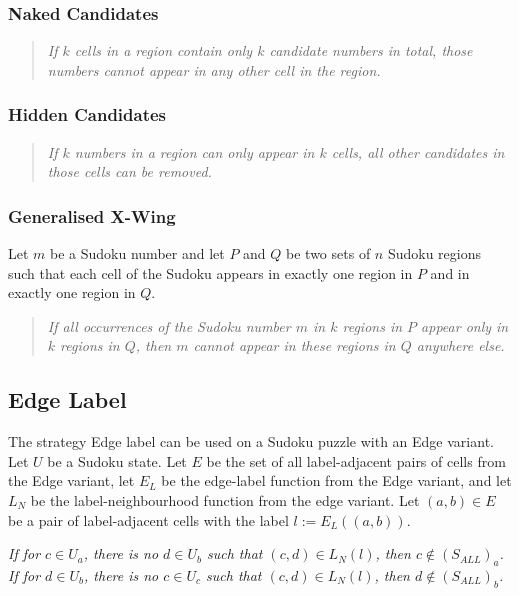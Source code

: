 \subsubsection*{Naked Candidates}

\begin{quote}
    \textit{
        If $k$ cells in a region contain only $k$ candidate numbers in total,
        those numbers cannot appear in any other cell in the region.
    }
\end{quote}

\subsubsection*{Hidden Candidates}

\begin{quote}
    \textit{
        If $k$ numbers in a region can only appear in $k$ cells,
        all other candidates in those cells can be removed.
    }
\end{quote}

\subsubsection*{Generalised X-Wing}

Let $m$ be a Sudoku number and let $P$ and $Q$ be two sets of $n$ Sudoku regions
such that each cell of the Sudoku appears in exactly one region in $P$ and in exactly one region in $Q$.

\begin{quote}
    \textit{
        If all occurrences of the Sudoku number $m$ in $k$ regions in $P$ appear only in $k$ regions in $Q$,
        then $m$ cannot appear in these regions in $Q$ anywhere else.
    }
\end{quote}

\subsection{Edge Label}\label{subsec:formal-edge-label}

The strategy Edge label can be used on a Sudoku puzzle with an Edge variant.
Let $U$ be a Sudoku state.
Let $E$ be the set of all label-adjacent pairs of cells from the Edge variant,
let $E_L$ be the edge-label function from the Edge variant,
and let $L_N$ be the label-neighbourhood function from the edge variant.
Let $(a, b) \in E$ be a pair of label-adjacent cells with the label $l := E_L((a, b))$.

\begin{list}{}{
    \setlength{\leftmargin}{1cm}
    \setlength{\parindent}{0pt}
}
\item{
    \itshape{If for $c \in U_a$, there is no $d \in U_b$ such that $(c, d) \in L_N(l)$, then $c \notin (S_{ALL})_a$. \\
    If for $d \in U_b$, there is no $c \in U_c$ such that $(c, d) \in L_N(l)$, then $d \notin (S_{ALL})_b$.}
}
\end{list}

